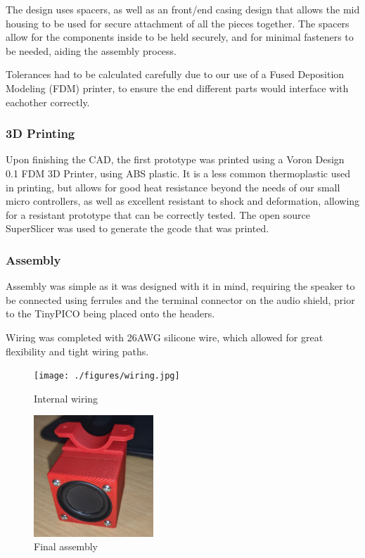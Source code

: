 {The design uses spacers, as well as an front/end casing design that allows the mid housing to be used for secure attachment of all the pieces together. The spacers allow for the components inside to be held securely, and for minimal fasteners to be needed, aiding the assembly process.



Tolerances had to be calculated carefully due to our use of a Fused Deposition Modeling (FDM) printer, to ensure the end different parts would interface with eachother correctly.

\subsubsection{3D Printing}

Upon finishing the CAD, the first prototype was printed using a Voron Design 0.1 FDM 3D Printer, using ABS plastic. It is a less common thermoplastic used in printing, but allows for good heat resistance beyond the needs of our small micro controllers, as well as excellent resistant to shock and deformation, allowing for a resistant prototype that can be correctly tested. The open source SuperSlicer was used to generate the gcode that was printed.

\subsubsection{Assembly}

Assembly was simple as it was designed with it in mind, requiring the speaker to be connected using ferrules and the terminal connector on the audio shield, prior to the TinyPICO being placed onto the headers.

Wiring was completed with 26AWG silicone wire, which allowed for great flexibility and tight wiring paths.

    \begin{figure}[H]
        \centering %
            \texttt{[image: ./figures/wiring.jpg]}
            \caption{Internal wiring}
        \label{fig:wiring}
    \end{figure}
    
        \begin{figure}[H]
        \centering %
            \includegraphics[width=0.4\textwidth,keepaspectratio, angle=0]{./figures/final-assembly.png}
            \caption{Final assembly}
        \label{fig:assembly}
    \end{figure}

}
